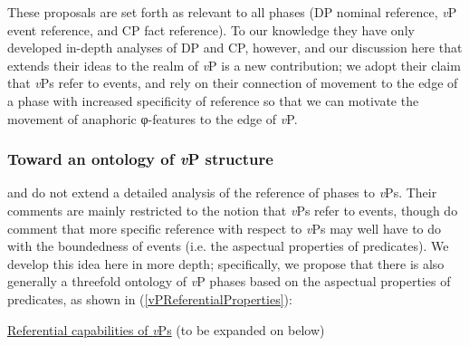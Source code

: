 
These proposals are set forth as relevant to all phases (DP nominal reference, \textit{v}P event reference, and CP fact reference).  To our knowledge they have only developed in-depth analyses of DP and CP, however, and our discussion here that extends their ideas to the realm of \textit{v}P is a new contribution; we adopt their claim that \textit{v}Ps refer to events, and rely on their connection of movement to the edge of a phase with increased specificity of reference so that we can motivate the movement of anaphoric φ-features to the edge of \textit{v}P. 

\subsubsection{Toward an ontology of \textit{v}P structure}

\citet{SheehanHinzen:2011} and \citet{HinzenSheehan:2013} do not extend a detailed analysis of the reference of phases to \textit{v}Ps. Their comments are mainly restricted to the notion that \textit{v}Ps refer to events, though \citet{SheehanHinzen:2011} do comment that more specific reference with respect to \textit{v}Ps may well have to do with the boundedness of events (i.e. the aspectual properties of predicates). We develop this idea here in more depth; specifically, we propose that there is also generally a threefold ontology of \textit{v}P phases based on the aspectual properties of predicates, as shown in (\ref{vPReferentialProperties}):%

\ea \label{vPReferentialProperties} \underline{Referential capabilities of \textit{v}Ps} (to be expanded on below)

